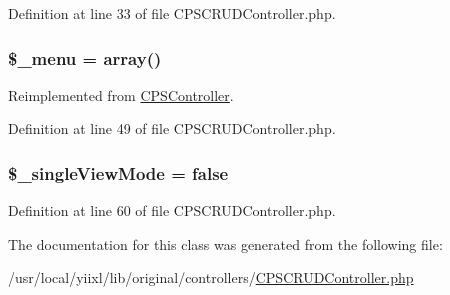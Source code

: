 Definition at line 33 of file CPSCRUDController.php.

\hypertarget{classCPSCRUDController_a4192f529627c76fa7a70ae23b9582516}{
\subsubsection[{\$\_\-menu}]{\setlength{\rightskip}{0pt plus 5cm}\$\_\-menu = {\bf array}()}}
\label{classCPSCRUDController_a4192f529627c76fa7a70ae23b9582516}


Reimplemented from \hyperlink{classCPSController_a4192f529627c76fa7a70ae23b9582516}{CPSController}.



Definition at line 49 of file CPSCRUDController.php.

\hypertarget{classCPSCRUDController_ab22a7f54c4b3430e4c56597bcc1eaa1d}{
\subsubsection[{\$\_\-singleViewMode}]{\setlength{\rightskip}{0pt plus 5cm}\$\_\-singleViewMode = false}}
\label{classCPSCRUDController_ab22a7f54c4b3430e4c56597bcc1eaa1d}


Definition at line 60 of file CPSCRUDController.php.



The documentation for this class was generated from the following file:\begin{DoxyCompactItemize}
\item 
/usr/local/yiixl/lib/original/controllers/\hyperlink{CPSCRUDController_8php}{CPSCRUDController.php}\end{DoxyCompactItemize}

